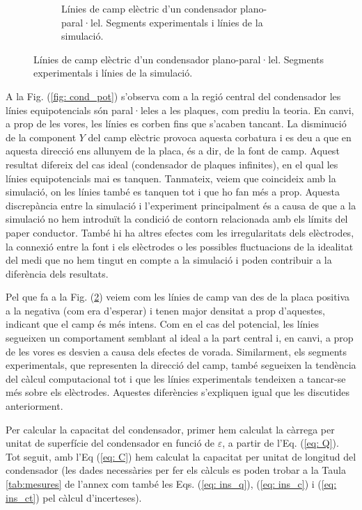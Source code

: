 \documentclass[11pt]{article}
\numberwithin{equation}{section}
\numberwithin{figure}{section}
\numberwithin{table}{section}
\begin{document}
\begin{figure}[h]
\begin{subfigure}{0.495\textwidth}
        \caption{Línies de camp elèctric d'un condensador plano-paral·lel. Segments experimentals i línies de la simulació.}
        \label{fig: cond_e}
    \end{subfigure}
\end{figure}

A la Fig. (\ref{fig: cond_pot}) s'observa com a la regió central del condensador les línies equipotencials són paral·leles a les plaques, com prediu la teoria. En canvi, a prop de les vores, les línies es corben fins que s'acaben tancant. La disminució de la component $Y$ del camp elèctric provoca aquesta corbatura i es deu a que en aquesta direcció ens allunyem de la placa, és a dir, de la font de camp. Aquest resultat difereix del cas ideal (condensador de plaques infinites), en el qual les línies equipotencials mai es tanquen. Tanmateix, veiem que coincideix amb la simulació, on les línies també es tanquen tot i que ho fan més a prop. Aquesta discrepància entre la simulació i l'experiment principalment és a causa de que a la simulació no hem introduït la condició de contorn relacionada amb els límits del paper conductor. També hi ha altres efectes com les irregularitats dels elèctrodes, la connexió entre la font i els elèctrodes o les possibles fluctuacions de la idealitat del medi que no hem tingut en compte a la simulació i poden contribuir a la diferència dels resultats.

Pel que fa a la Fig. (\ref{fig: cond_e}) veiem com les línies de camp van des de la placa positiva a la negativa (com era d'esperar) i tenen major densitat a prop d'aquestes, indicant que el camp és més intens. Com en el cas del potencial, les línies segueixen un comportament semblant al ideal a la part central i, en canvi, a prop de les vores es desvien a causa dels efectes de vorada. Similarment, els segments experimentals, que representen la direcció del camp, també segueixen la tendència del càlcul computacional tot i que les línies experimentals tendeixen a tancar-se més sobre els elèctrodes. Aquestes diferències s'expliquen igual que les discutides anteriorment.

Per calcular la capacitat del condensador, primer hem calculat la càrrega per unitat de superfície del condensador en funció de $\varepsilon$, a partir de l'Eq. (\ref{eq: Q}). Tot seguit, amb l'Eq (\ref{eq: C}) hem calculat la capacitat per unitat de longitud del condensador (les dades necessàries per fer els càlculs es poden trobar a la Taula \ref{tab:mesures} de l'annex com també les Eqs. (\ref{eq: ins_q}), (\ref{eq: ins_c}) i (\ref{eq: ins_ct}) pel càlcul d'incerteses).
\end{document}
